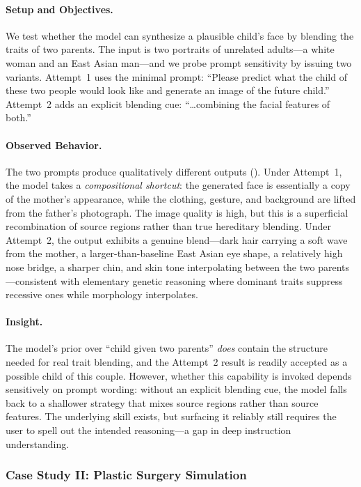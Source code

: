 \paragraph{Setup and Objectives.}
We test whether the model can synthesize a plausible child's face by blending the traits of two parents. The input is two portraits of unrelated adults---a white woman and an East Asian man---and we probe prompt sensitivity by issuing two variants. Attempt~1 uses the minimal prompt: ``Please predict what the child of these two people would look like and generate an image of the future child.'' Attempt~2 adds an explicit blending cue: ``\dots combining the facial features of both.''

\paragraph{Observed Behavior.}
The two prompts produce qualitatively different outputs (). Under Attempt~1, the model takes a \emph{compositional shortcut}: the generated face is essentially a copy of the mother's appearance, while the clothing, gesture, and background are lifted from the father's photograph. The image quality is high, but this is a superficial recombination of source regions rather than true hereditary blending. Under Attempt~2, the output exhibits a genuine blend---dark hair carrying a soft wave from the mother, a larger-than-baseline East Asian eye shape, a relatively high nose bridge, a sharper chin, and skin tone interpolating between the two parents---consistent with elementary genetic reasoning where dominant traits suppress recessive ones while morphology interpolates.

\paragraph{Insight.}
The model's prior over ``child given two parents'' \emph{does} contain the structure needed for real trait blending, and the Attempt~2 result is readily accepted as a possible child of this couple. However, whether this capability is invoked depends sensitively on prompt wording: without an explicit blending cue, the model falls back to a shallower strategy that mixes source regions rather than source features. The underlying skill exists, but surfacing it reliably still requires the user to spell out the intended reasoning---a gap in deep instruction understanding.



\subsubsection{Case Study II: Plastic Surgery Simulation}


